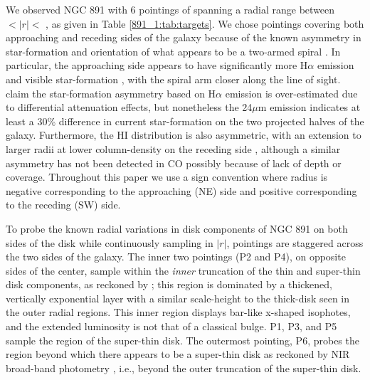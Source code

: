 We observed NGC 891 with 6 pointings of \GP spanning a radial range
between  $< \left|r\right| <$ ,
as given in Table \ref{891_1:tab:targets}. We chose pointings covering
both approaching and receding sides of the galaxy because of the known
asymmetry in star-formation and orientation of what appears to be a
two-armed spiral \citep{Xilouris99,Schechtman-Rook12}. In particular,
the approaching side appears to have significantly more H$\alpha$
emission and visible star-formation \citep{Rand90,Howk00,Kamphuis07a},
with the spiral arm closer along the line of sight. \cite{Kamphuis07b}
claim the star-formation asymmetry based on H$\alpha$ emission is
over-estimated due to differential attenuation effects, but
nonetheless the 24$\mu$m emission indicates at least a 30\% difference
in current star-formation on the two projected halves of the
galaxy. Furthermore, the HI distribution is also asymmetric, with an
extension to larger radii at lower column-density on the receding side
\citep{Swaters97,Oosterloo07}, although a similar asymmetry has not
been detected in CO \citep{Scoville93} possibly because of lack of
depth or coverage. Throughout this paper we use a sign convention
where radius is negative corresponding to the approaching (NE) side
and positive corresponding to the receding (SW) side.

To probe the known radial variations in disk components of NGC 891 on
both sides of the disk while continuously sampling in $|r|$, pointings
are staggered across the two sides of the galaxy. The inner two \GP
pointings (P2 and P4), on opposite sides of the center, sample within
the {\it inner} truncation of the thin and super-thin disk components,
as reckoned by \citet{Schechtman-Rook13}; this region is dominated by
a thickened, vertically exponential layer with a similar scale-height
to the thick-disk seen in the outer radial regions. This inner region
displays bar-like x-shaped isophotes, and the extended luminosity is
not that of a classical bulge. P1, P3, and P5 sample the region of the
super-thin disk. The outermost \GP pointing, P6, probes the region
beyond which there appears to be a super-thin disk as reckoned by NIR
broad-band photometry \citep{Schechtman-Rook12}, i.e., beyond the
outer truncation of the super-thin disk.

